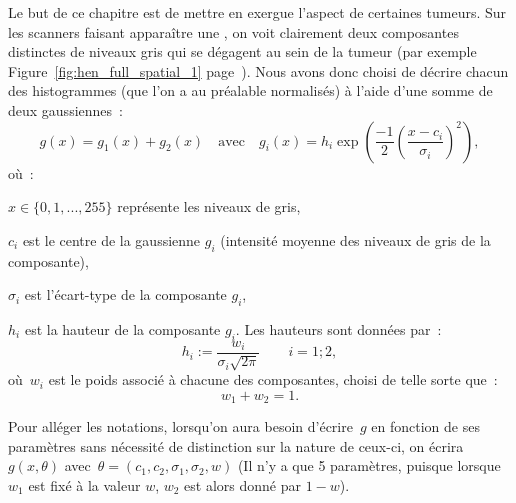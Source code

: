 \documentclass[main.tex]{subfiles}
\begin{document}
Le but de ce chapitre est de mettre en exergue l'aspect \heterogene de certaines tumeurs. Sur les scanners %
faisant apparaître une \hetero, 
on voit clairement deux composantes distinctes de niveaux gris qui se dégagent au sein de la tumeur (\cf par exemple Figure~\ref{fig:hen_full_spatial_1} page~\pageref{fig:hen_full_spatial_1}). Nous avons donc choisi de décrire chacun des histogrammes (que l'on a au préalable normalisés) à l'aide d'une somme de deux gaussiennes~:
\begin{equation}
\label{eq:decomp_gaussienne}
g(x) = g_1(x)+g_2(x) \quad \textrm{avec} \quad g_i(x) = h_i\exp \left(\frac{-1}{2} \left( \dfrac{x-c_i}{\sigma_i}\right)^2  \right),
\end{equation}
où~:
\begin{myitemize}
\item $x\in\{ 0,1, ..., 255\}$ représente les niveaux de gris,
\item $c_i$ est le centre de la gaussienne $g_i$ (\ie intensité moyenne des niveaux de gris de la composante),
\item $\sigma_i$ est l'écart-type de la composante $g_i$,
\item $h_i$ est la hauteur de la composante $g_i$. Les hauteurs sont données par~:
\begin{equation}
\label{eq:hauteur_gaussienne}
h_i := \dfrac{w_i}{\sigma_i \sqrt{2\pi}} \qquad i=1;2,
\end{equation}
où~$w_i$ est le poids associé à chacune des composantes, choisi de telle sorte que~:
\begin{equation}
w_1+w_2=1.
\end{equation}
\end{myitemize}

Pour alléger les notations, lorsqu'on aura besoin d'écrire~$g$ en fonction de ses paramètres sans nécessité de distinction sur la nature de ceux-ci, on écrira~$g(x,\theta)$ avec~$\theta =( c_1,c_2,\sigma_1,\sigma_2,w  )$ (Il n'y a que 5 paramètres, puisque lorsque $w_1$ est fixé à la valeur $w$, $w_2$ est alors donné par $1-w$).
\end{document}
